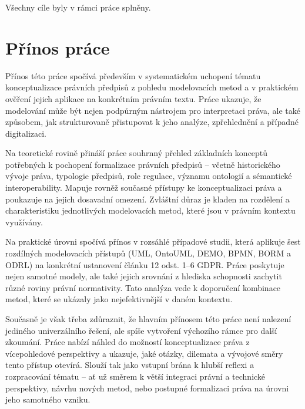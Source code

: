 \noindent Všechny cíle byly v rámci práce splněny. 

\section{Přínos práce}
\label{sec:prinos-prace}
Přínos této práce spočívá především v systematickém uchopení tématu konceptualizace právních předpisů z pohledu modelovacích metod a v praktickém ověření jejich aplikace na konkrétním právním textu. Práce ukazuje, že modelování může být nejen podpůrným nástrojem pro interpretaci práva, ale také způsobem, jak strukturovaně přistupovat k jeho analýze, zpřehlednění a případné digitalizaci.

Na teoretické rovině přináší práce souhrnný přehled základních konceptů potřebných k pochopení formalizace právních předpisů – včetně historického vývoje práva, typologie předpisů, role regulace, významu ontologií a sémantické interoperability. Mapuje rovněž současné přístupy ke konceptualizaci práva a poukazuje na jejich dosavadní omezení. Zvláštní důraz je kladen na rozdělení a charakteristiku jednotlivých modelovacích metod, které jsou v právním kontextu využívány.

Na praktické úrovni spočívá přínos v rozsáhlé případové studii, která aplikuje šest rozdílných modelovacích přístupů (UML, OntoUML, DEMO, BPMN, BORM a ODRL) na konkrétní ustanovení článku 12 odst. 1–6 GDPR. Práce poskytuje nejen samotné modely, ale také jejich srovnání z hlediska schopnosti zachytit různé roviny právní normativity. Tato analýza vede k doporučení kombinace metod, které se ukázaly jako nejefektivnější v daném kontextu.

Současně je však třeba zdůraznit, že hlavním přínosem této práce není nalezení jediného univerzálního řešení, ale spíše vytvoření výchozího rámce pro další zkoumání. Práce nabízí náhled do možností konceptualizace práva z vícepohledové perspektivy a ukazuje, jaké otázky, dilemata a vývojové směry tento přístup otevírá. Slouží tak jako vstupní brána k hlubší reflexi a rozpracování tématu – ať už směrem k větší integraci právní a technické perspektivy, návrhu nových metod, nebo postupné formalizaci práva na úrovni jeho samotného vzniku.

